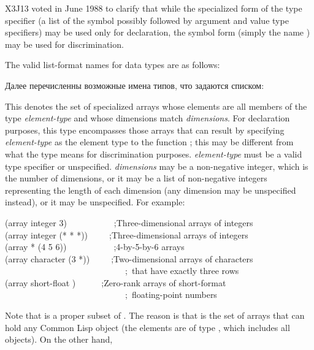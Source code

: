 \begin{new}
X3J13 voted in June 1988  to clarify that
while the specialized form of the  type specifier
(a list of the symbol  possibly followed by
argument and value type specifiers)
may be used only for declaration, the symbol form (simply the name
) may be used for discrimination.
\end{new}

The valid list-format names for data types are as follows:

Далее перечисленны возможные имена типов, что задаются списком:

\begin{flushdesc}
\item[\cd{(array {\it element-type} {\it dimensions})}]
This denotes the set
of specialized arrays
whose elements are all members of the type {\it element-type}
and whose dimensions match {\it dimensions}.
For declaration purposes, this type encompasses those arrays
that can result by specifying {\it element-type} as the element type
to the function ; this may be different
from what the type means for discrimination purposes.
{\it element-type} must be a valid type specifier or unspecified.
{\it dimensions} may be a non-negative integer, which is the number
of dimensions, or it may be a list of non-negative integers
representing the length of each dimension (any dimension
may be unspecified instead), or it may be unspecified.
For example:
\begin{lisp}
(array integer 3)~~~~~~~~~~~;{\rm Three-dimensional arrays of integers} \\
(array integer (* * *))~~~~~;{\rm Three-dimensional arrays of integers} \\
(array * (4 5 6))~~~~~~~~~~~;{\rm 4-by-5-by-6 arrays} \\
(array character (3 *))~~~~~;{\rm Two-dimensional arrays of characters} \\
~~~~~~~~~~~~~~~~~~~~~~~~~~~~;~{\rm that have exactly three rows} \\
(array short-float {\emptylist})~~~~~~;{\rm Zero-rank arrays of short-format} \\
~~~~~~~~~~~~~~~~~~~~~~~~~~~~;~{\rm floating-point numbers}
\end{lisp}
Note that  is a proper subset of .
The reason is that  is the set of arrays that can
hold any Common Lisp object (the elements are of type ,
which includes all objects).  On the other hand, 

\end{flushdesc}
